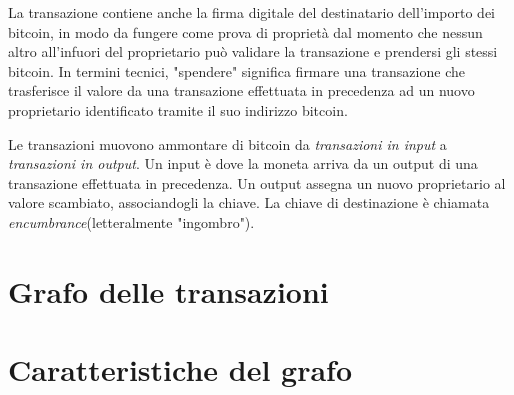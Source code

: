 La transazione contiene anche la firma digitale del destinatario dell'importo dei bitcoin, in modo da fungere come prova di proprietà dal momento che nessun altro all'infuori del proprietario può validare la transazione e prendersi gli stessi bitcoin. In termini tecnici, "spendere" significa firmare una transazione che trasferisce il valore da una transazione effettuata in precedenza ad un nuovo proprietario identificato tramite il suo indirizzo bitcoin.

Le transazioni muovono ammontare di bitcoin da \textit{transazioni in input} a \textit{transazioni in output}. Un input è dove la moneta arriva da un output di una transazione effettuata in precedenza. Un output assegna un nuovo proprietario al valore scambiato, associandogli la chiave. La chiave di destinazione è chiamata \textit{encumbrance}(letteralmente "ingombro").



\section{Grafo delle transazioni}
\section{Caratteristiche del grafo}